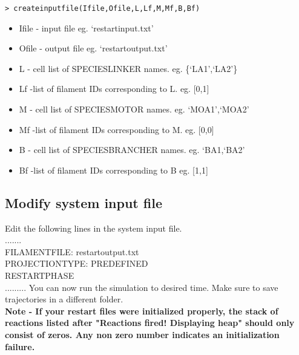 \documentclass[11pt, oneside]{article}   	%
\begin{document}
\noindent \texttt{> createinputfile(Ifile,Ofile,L,Lf,M,Mf,B,Bf)}\\ 
\begin{itemize}
\item Ifile - input file eg. `restartinput.txt'
 \item Ofile - output file eg. `restartoutput.txt'
 \item L - cell list of SPECIESLINKER names. eg. \{`LA1',`LA2'\}
\item Lf -list of filament IDs corresponding to L. eg. [0,1]
  \item M - cell list of SPECIESMOTOR names. eg. {`MOA1',`MOA2'}
  \item Mf -list of filament IDs corresponding to M. eg. [0,0]
  \item B - cell list of SPECIESBRANCHER names. eg. {`BA1,`BA2'}
 \item Bf -list of filament IDs corresponding to B eg. [1,1]
\end{itemize}
\subsection{Modify system input file}
Edit the following lines in the system input file. \\ \newline
\indent .......\\
 \indent FILAMENTFILE:           restartoutput.txt \\
\indent PROJECTIONTYPE:         PREDEFINED \\
\indent RESTARTPHASE \\
\indent .........\newline \newline
You can now run the simulation to desired time. Make sure to save trajectories in a different folder.\\
\textbf{Note - If your restart files were initialized properly, the stack of reactions listed after "Reactions fired! Displaying heap" should only consist of zeros. Any non zero number indicates an initialization failure.}
\end{document}
